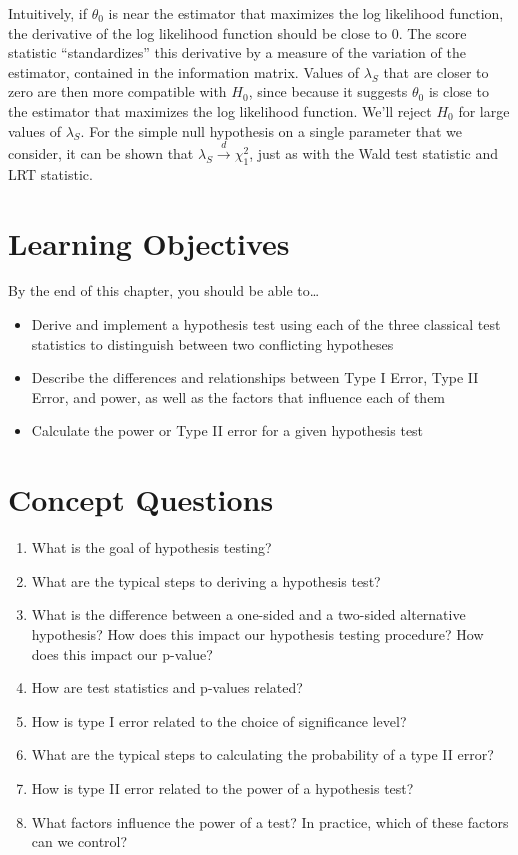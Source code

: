 \documentclass[
  letterpaper,
  DIV=11,
  numbers=noendperiod]{scrreprt}
\providecommand{\tightlist}{%
  \setlength{\itemsep}{0pt}\setlength{\parskip}{0pt}}\usepackage{longtable,booktabs,array}
\begin{document}
Intuitively, if \(\theta_0\) is near the estimator that maximizes the
log likelihood function, the derivative of the log likelihood function
should be close to \(0\). The score statistic ``standardizes'' this
derivative by a measure of the variation of the estimator, contained in
the information matrix. Values of \(\lambda_S\) that are closer to zero
are then more compatible with \(H_0\), since because it suggests
\(\theta_0\) is close to the estimator that maximizes the log likelihood
function. We'll reject \(H_0\) for large values of \(\lambda_S\). For
the simple null hypothesis on a single parameter that we consider, it
can be shown that \(\lambda_{S} \overset{d}{\to} \chi^2_1\), just as
with the Wald test statistic and LRT statistic.

\section{Learning Objectives}\label{learning-objectives-6}

By the end of this chapter, you should be able to\ldots{}

\begin{itemize}
\tightlist
\item
  Derive and implement a hypothesis test using each of the three
  classical test statistics to distinguish between two conflicting
  hypotheses
\item
  Describe the differences and relationships between Type I Error, Type
  II Error, and power, as well as the factors that influence each of
  them
\item
  Calculate the power or Type II error for a given hypothesis test
\end{itemize}

\section{Concept Questions}\label{concept-questions-6}

\begin{enumerate}
\def\labelenumi{\arabic{enumi}.}
\tightlist
\item
  What is the goal of hypothesis testing?
\item
  What are the typical steps to deriving a hypothesis test?
\item
  What is the difference between a one-sided and a two-sided alternative
  hypothesis? How does this impact our hypothesis testing procedure? How
  does this impact our p-value?
\item
  How are test statistics and p-values related?
\item
  How is type I error related to the choice of significance level?
\item
  What are the typical steps to calculating the probability of a type II
  error?
\item
  How is type II error related to the power of a hypothesis test?
\item
  What factors influence the power of a test? In practice, which of
  these factors can we control?
\end{enumerate}
\end{document}
